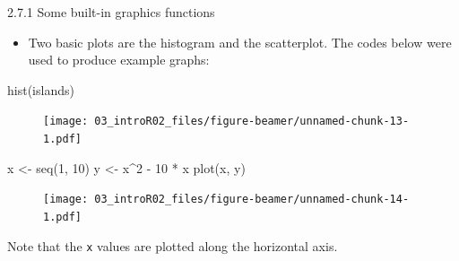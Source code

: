 \documentclass[
  9pt,
  a4paper,
  ignorenonframetext,
  notheorems]{beamer}
\newenvironment{Shaded}{\begin{snugshade}}{\end{snugshade}}
\newcommand{\DecValTok}[1]{\textcolor[rgb]{0.68,0.00,0.00}{#1}}
\newcommand{\FunctionTok}[1]{\textcolor[rgb]{0.28,0.35,0.67}{#1}}
\newcommand{\NormalTok}[1]{\textcolor[rgb]{0.00,0.23,0.31}{#1}}
\newcommand{\OtherTok}[1]{\textcolor[rgb]{0.00,0.23,0.31}{#1}}
\newcommand{\SpecialCharTok}[1]{\textcolor[rgb]{0.37,0.37,0.37}{#1}}
\providecommand{\tightlist}{%
  \setlength{\itemsep}{0pt}\setlength{\parskip}{0pt}}\usepackage{longtable,booktabs,array}
\begin{document}
\begin{frame}[fragile]{2.7.1 Some built-in graphics functions}
\protect\hypertarget{some-built-in-graphics-functions}{}
\begin{itemize}
\tightlist
\item
  Two basic plots are the histogram and the scatterplot. The codes below
  were used to produce example graphs:
\end{itemize}

\begin{Shaded}
\begin{Highlighting}[]
\FunctionTok{hist}\NormalTok{(islands)}
\end{Highlighting}
\end{Shaded}

\begin{figure}

{\centering \texttt{[image: 03\_introR02\_files/figure-beamer/unnamed-chunk-13-1.pdf]}

}

\end{figure}
\end{frame}

\begin{frame}[fragile]
\begin{Shaded}
\begin{Highlighting}[]
\NormalTok{x }\OtherTok{\textless{}{-}} \FunctionTok{seq}\NormalTok{(}\DecValTok{1}\NormalTok{, }\DecValTok{10}\NormalTok{) }
\NormalTok{y }\OtherTok{\textless{}{-}}\NormalTok{ x}\SpecialCharTok{\^{}}\DecValTok{2} \SpecialCharTok{{-}} \DecValTok{10} \SpecialCharTok{*}\NormalTok{ x }
\FunctionTok{plot}\NormalTok{(x, y)}
\end{Highlighting}
\end{Shaded}

\begin{figure}

{\centering \texttt{[image: 03\_introR02\_files/figure-beamer/unnamed-chunk-14-1.pdf]}

}

\end{figure}

Note that the \texttt{x} values are plotted along the horizontal axis.
\end{frame}
\end{document}
